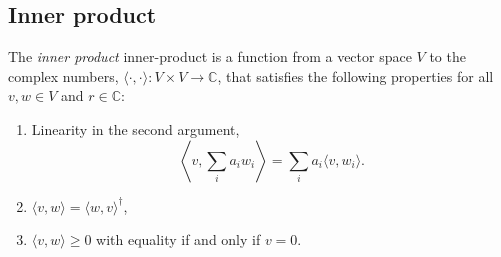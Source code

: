 



\subsection{Inner product}

\begin{definition}
The \emph{inner product}  \gls{inner-product} is a function from a vector space $V$ to the complex numbers, $\langle \cdot, \cdot \rangle : V \times V \rightarrow \mathbb{C}$,  that satisfies the following properties for all $v, w \in V$ and $r \in \mathbb{C}$:

\begin{enumerate}
  \item Linearity in the second argument,$$ \left\langle v, \sum_{i} a_i w_i\right\rangle = \sum_i a_i \langle v, w_i\rangle. $$
  \item $\langle v,w \rangle = \langle w,v \rangle^{\dag} $, 
  \item  $\langle v,w \rangle \geq 0 $ with equality if and only if $v = 0$.
\end{enumerate}
\end{definition}



